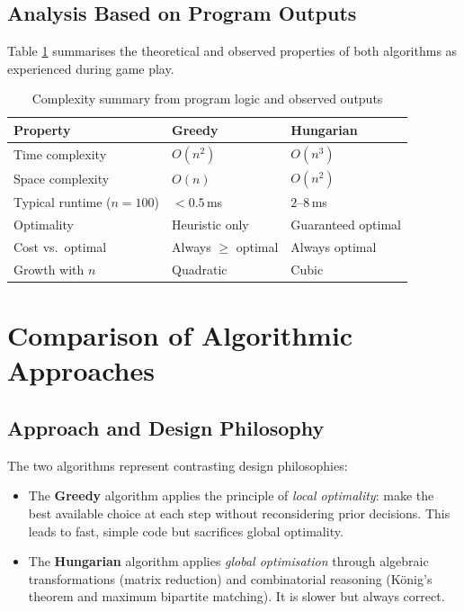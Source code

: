 \documentclass[12pt,a4paper]{article}
\begin{document}
\subsection{Analysis Based on Program Outputs}

Table \ref{tab:complexity} summarises the theoretical and observed properties of
both algorithms as experienced during game play.

\begin{table}[H]
    \centering
    \caption{Complexity summary from program logic and observed outputs}
    \label{tab:complexity}
    \begin{tabularx}{\linewidth}{lXX}
        \toprule
        \textbf{Property}          & \textbf{Greedy}      & \textbf{Hungarian}   \\
        \midrule
        Time complexity            & $O(n^2)$             & $O(n^3)$             \\
        Space complexity           & $O(n)$               & $O(n^2)$             \\
        Typical runtime ($n=100$)  & $< 0.5$\,ms          & $2$--$8$\,ms         \\
        Optimality                 & Heuristic only       & Guaranteed optimal   \\
        Cost vs.\ optimal          & Always $\geq$ optimal & Always optimal      \\
        Growth with $n$            & Quadratic            & Cubic                \\
        \bottomrule
    \end{tabularx}
\end{table}

\clearpage
\section{Comparison of Algorithmic Approaches}

\subsection{Approach and Design Philosophy}

The two algorithms represent contrasting design philosophies:

\begin{itemize}
    \item The \textbf{Greedy} algorithm applies the principle of \emph{local optimality}:
          make the best available choice at each step without reconsidering prior
          decisions. This leads to fast, simple code but sacrifices global optimality.
    \item The \textbf{Hungarian} algorithm applies \emph{global optimisation} through
          algebraic transformations (matrix reduction) and combinatorial reasoning
          (König's theorem and maximum bipartite matching). It is slower but
          always correct.
\end{itemize}
\end{document}
